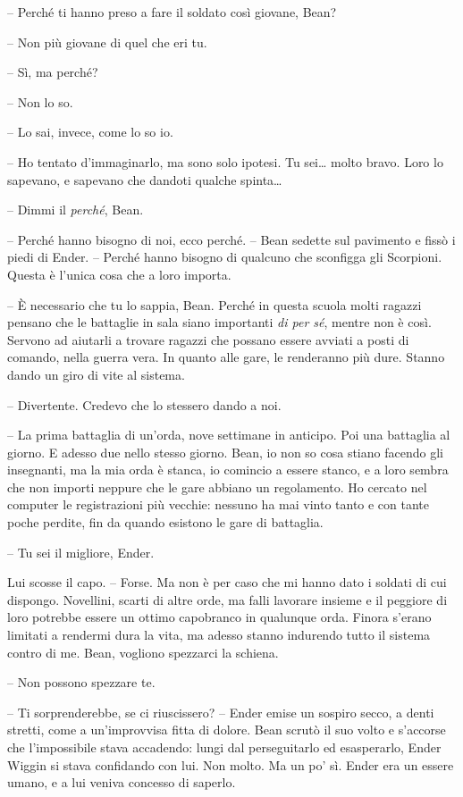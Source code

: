 {-- Perché ti hanno preso a fare il soldato così giovane, Bean?}

{-- Non più giovane di quel che eri tu.}

{-- Sì, ma perché?}

{-- Non lo so.}

{-- Lo sai, invece, come lo so io.}

{-- Ho tentato d'immaginarlo, ma sono solo ipotesi. Tu sei\ldots{} molto
	bravo. Loro lo sapevano, e sapevano che dandoti qualche spinta\ldots{}}

{-- Dimmi il \emph{perché}, \emph{} Bean.}

{-- Perché hanno bisogno di noi, ecco perché. -- Bean sedette sul
	pavimento e fissò i piedi di Ender. -- Perché hanno bisogno di qualcuno
	che sconfigga gli Scorpioni. Questa è l'unica cosa che a loro importa.}

{-- È necessario che tu lo sappia, Bean. Perché in questa scuola molti
	ragazzi pensano che le battaglie in sala siano importanti \emph{di per
		sé}, \emph{} mentre non è così. Servono ad aiutarli a trovare ragazzi
	che possano essere avviati a posti di comando, nella guerra vera. In
	quanto alle gare, le renderanno più dure. Stanno dando un giro di vite
	al sistema.}

{-- Divertente. Credevo che lo stessero dando a noi.}

{-- La prima battaglia di un'orda, nove settimane in anticipo. Poi una
	battaglia al giorno. E adesso due nello stesso giorno. Bean, io non so
	cosa stiano facendo gli insegnanti, ma la mia orda è stanca, io comincio
	a essere stanco, e a loro sembra che non importi neppure che le gare
	abbiano un regolamento. Ho cercato nel computer le registrazioni più
	vecchie: nessuno ha mai vinto tanto e con tante poche perdite, fin da
	quando esistono le gare di battaglia.}

{-- Tu sei il migliore, Ender.}

{Lui scosse il capo. -- Forse. Ma non è per caso che mi hanno dato i
	soldati di cui dispongo. Novellini, scarti di altre orde, ma falli
	lavorare insieme e il peggiore di loro potrebbe essere un ottimo
	capobranco in qualunque orda. Finora s'erano limitati a rendermi dura la
	vita, ma adesso stanno indurendo tutto il sistema contro di me. Bean,
	vogliono spezzarci la schiena.}

{-- Non possono spezzare te.}

{-- Ti sorprenderebbe, se ci riuscissero? -- Ender emise un sospiro
	secco, a denti stretti, come a un'improvvisa fitta di dolore. Bean
	scrutò il suo volto e s'accorse che l'impossibile stava accadendo: lungi
	dal perseguitarlo ed esasperarlo, Ender Wiggin si stava confidando con
	lui. Non molto. Ma un po' sì. Ender era un essere umano, e a lui veniva
	concesso di saperlo.}

